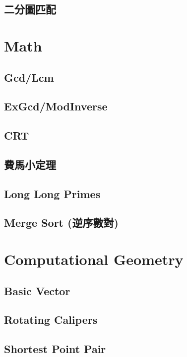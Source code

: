 	\subsection{二分圖匹配}
		
\section{Math}
	\subsection{Gcd/Lcm}
		
	\subsection{ExGcd/ModInverse}
		
	\subsection{CRT}
		
	\subsection{費馬小定理}
		
	\subsection{Long Long Primes}
		
	\subsection{Merge Sort (逆序數對)}
		
\section{Computational Geometry}
	\subsection{Basic Vector}
		
	\subsection{Rotating Calipers}
		
	\subsection{Shortest Point Pair}
		
